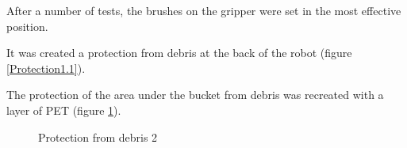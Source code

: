 After a number of tests, the brushes on the gripper were set in the most effective position.

It was created a protection from debris at the back of the robot (figure \ref{Protection1.1}).

The protection of the area under the bucket from debris was recreated with a layer of PET (figure \ref{Protection1.2}).

\begin{figure}[H]
	\begin{minipage}[h]{0.47\linewidth}
		\caption{Protection from debris 1}
		\label{Protection1.1}
	\end{minipage}
	\hfill
	\begin{minipage}[h]{0.47\linewidth}
		\caption{Protection from debris 2}
		\label{Protection1.2}
	\end{minipage}
\end{figure}

